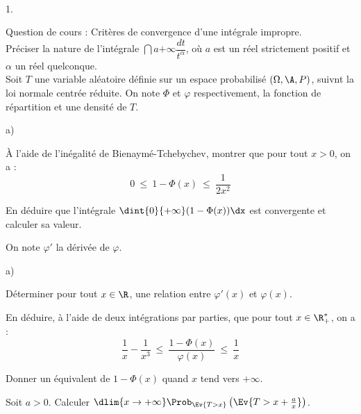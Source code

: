 \documentclass[11pt]{article}%
\begin{document}
\begin{exerciceAP}~
  \begin{noliste}{1.}
    \setlength{\itemsep}{2mm}
  \item Question de cours : Critères de convergence d'une intégrale
    impropre.\\
    Préciser la nature de l'intégrale $\dint{a}{+\infty}
    \dfrac{dt}{t^\alpha}$, où $a$ est un réel strictement positif et
    $\alpha$ un réel quelconque.\\
    Soit $T$ une variable aléatoire définie sur un espace probabilisé
    $(\Omega,\A,P)$, suivnt la loi normale centrée réduite. On note
    $\Phi$ et $\varphi$ respectivement, la fonction de répartition et
    une densité de $T$.
  \item
    \begin{noliste}{a)}
      \setlength{\itemsep}{2mm}
    \item À l'aide de l'inégalité de Bienaymé-Tchebychev, montrer que
      pour tout $x>0$, on a :
      \[
      0 \ \leq \ 1-\Phi(x) \ \leq \ \dfrac{1}{2x^2}
      \]
    \item En déduire que l'intégrale $\dint{0}{+\infty}
      (1-\Phi(x))\dx$ est convergente et calculer sa valeur.
    \end{noliste}

  \item On note $\varphi'$ la dérivée de $\varphi$.
    \begin{noliste}{a)}
    \setlength{\itemsep}{2mm}
    \item Déterminer pour tout $x\in\R$, une relation entre
      $\varphi'(x)$ et $\varphi(x)$.
    \item En déduire, à l'aide de deux intégrations par parties, que
      pour tout $x\in\R_+^*$, on a :
      \[
      \dfrac{1}{x}-\dfrac{1}{x^3} \ \leq \
      \dfrac{1-\Phi(x)}{\varphi(x)} \ \leq \ \dfrac{1}{x}
      \]
    \item Donner un équivalent de $1-\Phi(x)$ quand $x$ tend vers
      $+\infty$.
    \end{noliste}

  \item Soit $a>0$. Calculer $\dlim{x\to+\infty} \Prob_{\Ev{T>x}}
    \left( \Ev{ T > x + \frac{a}{x} } \right)$.
  \end{noliste}
\end{exerciceAP}

\end{document}
